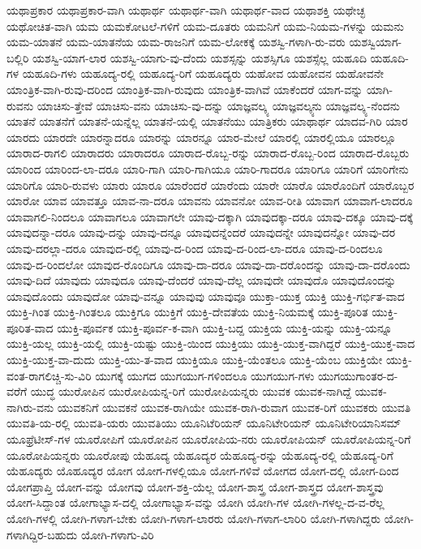 {ಯಥಾಪ್ರಕಾರ
ಯಥಾಪ್ರಕಾರ-ವಾಗಿ
ಯಥಾರ್ಥ
ಯಥಾರ್ಥ-ವಾಗಿ
ಯಥಾರ್ಥ-ವಾದ
ಯಥಾಶಕ್ತಿ
ಯಥೇಚ್ಛ
ಯಥೋಚಿತ-ವಾಗಿ
ಯಮ
ಯಮಕೋಟಲೆ-ಗಳಿಗೆ
ಯಮ-ದೂತರು
ಯಮನಿಗೆ
ಯಮ-ನಿಯಮ-ಗಳನ್ನು
ಯಮನು
ಯಮ-ಯಾತನೆ
ಯಮ-ಯಾತನೆಯ
ಯಮ-ರಾಜನಿಗೆ
ಯಮ-ಲೋಕಕ್ಕೆ
ಯಶಸ್ವಿ-ಗಳಾಗಿ-ರು-ವರು
ಯಶಸ್ವಿಯಾಗ-ಬಲ್ಲಿರಿ
ಯಶಸ್ವಿ-ಯಾಗ-ಲಾರ
ಯಶಸ್ವಿ-ಯಾಗು-ವು-ದೆಂದು
ಯಶಸ್ಸನ್ನು
ಯಶಸ್ಸಿಗೂ
ಯಶಸ್ಸೆಲ್ಲ
ಯಹೂದಿ
ಯಹೂದಿ-ಗಳ
ಯಹೂದಿ-ಗಳು
ಯಹೂದ್ಯ-ರಲ್ಲಿ
ಯಹೂದ್ಯ-ರಿಗೆ
ಯಹೂದ್ಯರು
ಯಹೋವ
ಯಹೋವನ
ಯಹೋವನೇ
ಯಾಂತ್ರಿಕ-ವಾಗಿ-ರುವು-ದರಿಂದ
ಯಾಂತ್ರಿಕ-ವಾಗಿ-ರುವುದು
ಯಾಂತ್ರಿಕ-ವಾಗಿವೆ
ಯಾಕೆಂದರೆ
ಯಾಗ-ವನ್ನು
ಯಾಗಿ-ರುವನು
ಯಾಚಿಸು-ತ್ತೇವೆ
ಯಾಚಿಸು-ವನು
ಯಾಚಿಸು-ವು-ದನ್ನು
ಯಾಜ್ಞವಲ್ಕ್ಯ
ಯಾಜ್ಞವಲ್ಕ್ಯನು
ಯಾಜ್ಞವಲ್ಕ್ಯ-ನೆಂದನು
ಯಾತನೆ
ಯಾತನೆಗೆ
ಯಾತನೆ-ಯನ್ನೆಲ್ಲ
ಯಾತನೆ-ಯಲ್ಲಿ
ಯಾತನೆಯು
ಯಾತ್ರಿಕರು
ಯಾಥಾರ್ಥ
ಯಾದವ-ಗಿರಿ
ಯಾರ
ಯಾರದು
ಯಾರದೇ
ಯಾರನ್ನಾದರೂ
ಯಾರನ್ನು
ಯಾರನ್ನೂ
ಯಾರ-ಮೇಲೆ
ಯಾರಲ್ಲಿ
ಯಾರಲ್ಲಿಯೂ
ಯಾರಲ್ಲೂ
ಯಾರಾದ-ರಾಗಲಿ
ಯಾರಾದರು
ಯಾರಾದರೂ
ಯಾರಾದ-ರೊಬ್ಬ-ರನ್ನು
ಯಾರಾದ-ರೊಬ್ಬ-ರಿಂದ
ಯಾರಾದ-ರೊಬ್ಬರು
ಯಾರಿಂದ
ಯಾರಿಂದ-ಲಾ-ದರೂ
ಯಾರಿ-ಗಾಗಿ
ಯಾರಿ-ಗಾಗಿಯೂ
ಯಾರಿ-ಗಾದರೂ
ಯಾರಿಗೂ
ಯಾರಿಗೆ
ಯಾರಿಗೇನು
ಯಾರಿಗೊ
ಯಾರಿ-ರುವಳು
ಯಾರು
ಯಾರೂ
ಯಾರೆಂದರೆ
ಯಾರೆಂದು
ಯಾರೇ
ಯಾರೊ
ಯಾರೊಂದಿಗೆ
ಯಾರೊಬ್ಬರ
ಯಾರೋ
ಯಾವ
ಯಾವತ್ತೂ
ಯಾವ-ನಾ-ದರೂ
ಯಾವನು
ಯಾವನೋ
ಯಾವ-ರೀತಿ
ಯಾವಾಗ
ಯಾವಾಗ-ಲಾದರೂ
ಯಾವಾಗಲಿ-ನಿಂದಲೂ
ಯಾವಾಗಲೂ
ಯಾವಾಗಲೇ
ಯಾವು-ದಕ್ಕಾಗಿ
ಯಾವುದಕ್ಕಾ-ದರೂ
ಯಾವು-ದಕ್ಕೂ
ಯಾವು-ದಕ್ಕೆ
ಯಾವುದನ್ನಾ-ದರೂ
ಯಾವು-ದನ್ನು
ಯಾವು-ದನ್ನೂ
ಯಾವುದನ್ನೆಂದರೆ
ಯಾವುದನ್ನೇ
ಯಾವುದನ್ನೋ
ಯಾವು-ದರ
ಯಾವು-ದರಲ್ಲಾ-ದರೂ
ಯಾವುದ-ರಲ್ಲಿ
ಯಾವು-ದ-ರಿಂದ
ಯಾವು-ದ-ರಿಂದ-ಲಾ-ದರೂ
ಯಾವು-ದ-ರಿಂದಲೂ
ಯಾವು-ದ-ರಿಂದಲೋ
ಯಾವುದ-ರೊಂದಿಗೂ
ಯಾವು-ದಾ-ದರೂ
ಯಾವು-ದಾ-ದರೊಂದನ್ನು
ಯಾವು-ದಾ-ದರೊಂದು
ಯಾವು-ದಿದೆ
ಯಾವುದು
ಯಾವುದೂ
ಯಾವು-ದೆಂದರೆ
ಯಾವು-ದೆಲ್ಲ
ಯಾವುದೇ
ಯಾವುದೊ
ಯಾವುದೊಂದನ್ನು
ಯಾವುದೊಂದು
ಯಾವುದೋ
ಯಾವು-ವನ್ನೂ
ಯಾವುವು
ಯಾವುವೂ
ಯುಕ್ತಾ-ಯುಕ್ತ
ಯುಕ್ತಿ
ಯುಕ್ತಿ-ಗರ್ಭಿತ-ವಾದ
ಯುಕ್ತಿ-ಗಿಂತ
ಯುಕ್ತಿ-ಗಿಂತಲೂ
ಯುಕ್ತಿಗೂ
ಯುಕ್ತಿಗೆ
ಯುಕ್ತಿ-ದೇವತೆಯ
ಯುಕ್ತಿ-ನಿಯಮಕ್ಕೆ
ಯುಕ್ತಿ-ಪೂರಿತ
ಯುಕ್ತಿ-ಪೂರಿತ-ವಾದ
ಯುಕ್ತಿ-ಪೂರ್ವಕ
ಯುಕ್ತಿ-ಪೂರ್ವ-ಕ-ವಾಗಿ
ಯುಕ್ತಿ-ಬದ್ದ
ಯುಕ್ತಿಯ
ಯುಕ್ತಿ-ಯನ್ನು
ಯುಕ್ತಿ-ಯನ್ನೂ
ಯುಕ್ತಿ-ಯಲ್ಲ
ಯುಕ್ತಿ-ಯಲ್ಲಿ
ಯುಕ್ತಿ-ಯಷ್ಟು
ಯುಕ್ತಿ-ಯಿಂದ
ಯುಕ್ತಿಯು
ಯುಕ್ತಿ-ಯುಕ್ತ-ವಾಗಿದ್ದರೆ
ಯುಕ್ತಿ-ಯುಕ್ತ-ವಾದ
ಯುಕ್ತಿ-ಯುಕ್ತ-ವಾ-ದುದು
ಯುಕ್ತಿ-ಯು-ತ-ವಾದ
ಯುಕ್ತಿಯೂ
ಯುಕ್ತಿ-ಯೆಂತಲೂ
ಯುಕ್ತಿ-ಯೆಂಬ
ಯುಕ್ತಿಯೇ
ಯುಕ್ತಿ-ವಂತ-ರಾಗಲಿಚ್ಚಿ-ಸು-ವಿರಿ
ಯುಗಕ್ಕೆ
ಯುಗದ
ಯುಗಯುಗ-ಗಳಿಂದಲೂ
ಯುಗಯುಗ-ಗಳು
ಯುಗಯುಗಾಂತರ-ದ-ವರೆಗೆ
ಯುದ್ಧ
ಯುರೋಪಿನ
ಯುರೋಪಿಯನ್ನ-ರಿಗೆ
ಯುರೋಪಿಯನ್ನರು
ಯುವಕ
ಯುವಕ-ನಾಗಿದ್ದೆ
ಯುವಕ-ನಾಗಿರು-ವನು
ಯುವಕನಿಗೆ
ಯುವಕನೆ
ಯುವಕ-ರಾಗಿಯೇ
ಯುವಕ-ರಾಗಿ-ರುವಾಗ
ಯುವಕ-ರಿಗೆ
ಯುವಕರು
ಯುವತಿ
ಯುವತಿ-ಯ-ರಲ್ಲಿ
ಯುವತಿ-ಯರು
ಯುವತಿಯು
ಯೂನಿಟೆರಿಯನ್
ಯೂನಿಟೇರಿಯನ್
ಯೂನಿಟೇರಿಯಾನಿಸಮ್
ಯೂಫ್ರೆಟೀಸ್-ಗಳ
ಯೂರೋಪಿಗೆ
ಯೂರೋಪಿನ
ಯೂರೋಪಿಯ-ನರು
ಯೂರೋಪಿಯನ್
ಯೂರೋಪಿಯನ್ನ-ರಿಗೆ
ಯೂರೋಪಿಯನ್ನರು
ಯೂರೋಪು
ಯೆಹೂದ್ಯ
ಯೆಹೂದ್ಯರ
ಯೆಹೂದ್ಯ-ರನ್ನು
ಯೆಹೂದ್ಯ-ರಲ್ಲಿ
ಯೆಹೂದ್ಯ-ರಿಗೆ
ಯೆಹೂದ್ಯರು
ಯೊಹೂದ್ಯರ
ಯೋಗ
ಯೋಗ-ಗಳಲ್ಲಿಯೂ
ಯೋಗ-ಗಳಿವೆ
ಯೋಗದ
ಯೋಗ-ದಲ್ಲಿ
ಯೋಗ-ದಿಂದ
ಯೋಗಪ್ರಾಪ್ತಿ
ಯೋಗ-ವನ್ನು
ಯೋಗವು
ಯೋಗ-ಶಕ್ತಿ-ಯೆಲ್ಲ
ಯೋಗ-ಶಾಸ್ತ್ರ
ಯೋಗ-ಶಾಸ್ತ್ರದ
ಯೋಗ-ಶಾಸ್ತ್ರವು
ಯೋಗ-ಸಿದ್ದಾಂತ
ಯೋಗಾಭ್ಯಾಸ-ದಲ್ಲಿ
ಯೋಗಾಭ್ಯಾಸ-ವನ್ನು
ಯೋಗಿ
ಯೋಗಿ-ಗಳ
ಯೋಗಿ-ಗಳಲ್ಲ-ದ-ವ-ರೆಲ್ಲ
ಯೋಗಿ-ಗಳಲ್ಲಿ
ಯೋಗಿ-ಗಳಾಗ-ಬೇಕು
ಯೋಗಿ-ಗಳಾಗ-ಲಾರರು
ಯೋಗಿ-ಗಳಾಗ-ಲಾರಿರಿ
ಯೋಗಿ-ಗಳಾಗಿದ್ದರು
ಯೋಗಿ-ಗಳಾಗಿದ್ದಿರ-ಬಹುದು
ಯೋಗಿ-ಗಳಾಗು-ವಿರಿ
}
